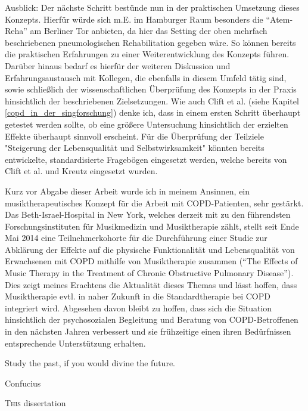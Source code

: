Ausblick: 
Der nächste Schritt bestünde nun in der praktischen Umsetzung dieses Konzepts. Hierfür würde sich m.E. im Hamburger Raum besonders die "`Atem-Reha"' am Berliner Tor anbieten, da hier das Setting der oben mehrfach beschriebenen pneumologischen Rehabilitation gegeben wäre. So können bereits die praktischen Erfahrungen zu einer Weiterentwicklung des Konzepts führen. Darüber hinaus bedarf es hierfür der weiteren Diskussion und Erfahrungsaustausch mit Kollegen, die ebenfalls in diesem Umfeld tätig sind, sowie schließlich der wissenschaftlichen Überprüfung des Konzepts in der Praxis hinsichtlich der beschriebenen Zielsetzungen. Wie auch Clift et al. (siehe Kapitel \ref{copd_in_der_singforschung}) denke ich, dass in einem ersten Schritt überhaupt getestet werden sollte, ob eine größere Untersuchung hinsichtlich der erzielten Effekte überhaupt sinnvoll erscheint. Für die Überprüfung der Teilziele "Steigerung der Lebensqualität und Selbstwirksamkeit" könnten bereits entwickelte, standardisierte Fragebögen eingesetzt werden, welche bereits von Clift et al. und Kreutz eingesetzt wurden.

Kurz vor Abgabe dieser Arbeit wurde ich in meinem Ansinnen, ein musiktherapeutisches Konzept für die Arbeit mit COPD-Patienten, sehr gestärkt. Das Beth-Israel-Hospital in New York, welches derzeit mit zu den führendsten Forschungsinstituten für Musikmedizin und Musiktherapie zählt, stellt seit Ende Mai 2014 eine Teilnehmerkohorte für die Durchführung einer Studie zur Abklärung der Effekte auf die physische Funktionalität und Lebensqualität von Erwachsenen mit COPD mithilfe von Musiktherapie zusammen ("`The Effects of Music Therapy in the Treatment of Chronic Obstructive Pulmonary Disease"'). Dies zeigt meines Erachtens die Aktualität dieses Themas und lässt hoffen, dass Musiktherapie evtl. in naher Zukunft in die Standardtherapie bei COPD integriert wird. Abgesehen davon bleibt zu hoffen, dass sich die Situation hinsichtlich der psychosozialen Begleitung und Beratung von COPD-Betroffenen in den nächsten Jahren verbessert und sie frühzeitige einen ihren Bedürfnissen entsprechende Unterstützung erhalten.

\setlength{\epigraphwidth}{7.5cm}
\epigraph{Study the past, if you would divine the future.}{Confucius}

\ifpdf
    \graphicspath{{X/figures/PNG/}{X/figures/PDF/}{X/figures/}}
\else
    \graphicspath{{X/figures/EPS/}{X/figures/}}
\fi

\lettrine{T}{his} dissertation 

\newpage\thispagestyle{empty}
